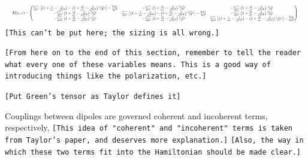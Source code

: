 \documentclass[aps,pra,superscriptaddress,twocolumn]{revtex4-1}
\newcommand{\commentSB}[1]{\texttt{\color{blue}[#1]}}
\newcommand{\commentTP}[1]{\texttt{\color{green}[#1]}}
\begin{document}
\begin{equation} \resizebox{1.0\hsize}{!}{
    $ \textbf{G}(\textbf{r},\omega) = \begin{pmatrix}
        \frac{e^{i\omega r}}{4\pi r} \left[ \left( 1 + \frac{i}{\omega r} - \frac{1}{\omega^2 r^2} \right) - \left( 1 + \frac{3i}{\omega r} - \frac{3}{\omega^2 r^2} \right) \frac{r_x r_x}{r^2} \right] - \frac{\delta(\textbf{r})}{3\omega^2}
        & -\frac{e^{i\omega r}}{4\pi r} \left( 1 + \frac{3i}{\omega r} - \frac{3}{\omega^2 r^2} \right) \frac{r_x r_y}{r^2}
        & -\frac{e^{i\omega r}}{4\pi r}  \left( 1 + \frac{3i}{\omega r} - \frac{3}{\omega^2 r^2} \right) \frac{r_x r_z}{r^2}  \\
        - \frac{e^{i\omega r}}{4\pi r} \left( 1 + \frac{3i}{\omega r} - \frac{3}{\omega^2 r^2} \right) \frac{r_y r_x}{r^2}  
        & \frac{e^{i\omega r}}{4\pi r} \left[ \left( 1 + \frac{i}{\omega r} - \frac{1}{\omega^2 r^2} \right) - \left( 1 + \frac{3i}{\omega r} - \frac{3}{\omega^2 r^2} \right) \frac{r_y r_y}{r^2} \right] - \frac{\delta(\textbf{r})}{3\omega^2} 
        & - \frac{e^{i\omega r}}{4\pi r} \left( 1 + \frac{3i}{\omega r} - \frac{3}{\omega^2 r^2} \right) \frac{r_y r_z}{r^2} \\
        - \frac{e^{i\omega r}}{4\pi r} \left( 1 + \frac{3i}{\omega r} - \frac{3}{\omega^2 r^2} \right) \frac{r_z r_x}{r^2} 
        & - \frac{e^{i\omega r}}{4\pi r} \left( 1 + \frac{3i}{\omega r} - \frac{3}{\omega^2 r^2} \right) \frac{r_z r_y}{r^2} 
        & \frac{e^{i\omega r}}{4\pi r} \left[ \left( 1 + \frac{i}{\omega r} - \frac{1}{\omega^2 r^2} \right) - \left( 1 + \frac{3i}{\omega r} - \frac{3}{\omega^2 r^2} \right) \frac{r_z r_z}{r^2} \right] - \frac{\delta(\textbf{r})}{3\omega^2}
    \end{pmatrix} $
    \label{eqn:green}
    }\end{equation}
    \commentSB{This can't be put here; the sizing is all wrong.}

    \commentTP{From here on to the end of this section, remember to tell the reader what every one of these variables means. This is a good way of introducing things like the polarization, etc.}

    \commentTP{Put Green's tensor as Taylor defines it}

    Couplings between dipoles are governed coherent and incoherent terms, respectively, 
    \commentSB{This idea of "coherent" and "incoherent" terms is taken from Taylor's paper, and deserves more explanation.}
    \commentSB{Also, the way in which these two terms fit into the Hamiltonian should be made clear.}
\end{document}
